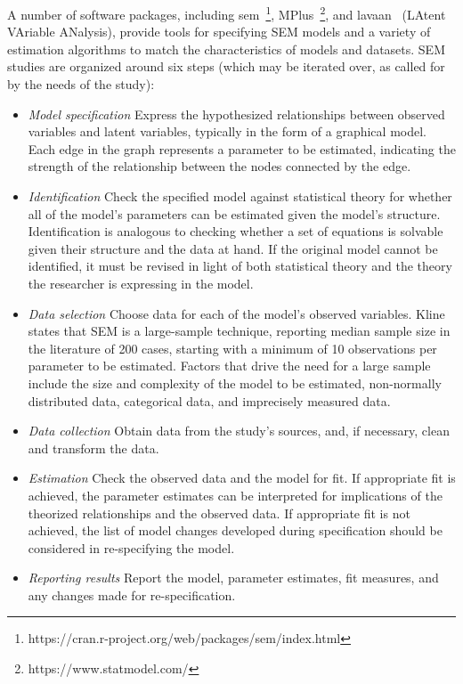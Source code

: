 A number of software packages, including sem~\footnote{https://cran.r-project.org/web/packages/sem/index.html}, MPlus~\footnote{https://www.statmodel.com/}, and lavaan~\cite{roseel2012lavaan} (LAtent VAriable ANalysis), provide tools for specifying SEM models and a variety of estimation algorithms to match the characteristics of models and datasets. 
SEM studies are organized around six steps (which may be iterated over, as called for by the needs of the study): 
\begin{itemize}
\item \textit{Model specification} Express the hypothesized relationships between observed variables and latent variables, typically in the form of a graphical model. Each edge in the graph represents a parameter to be estimated, indicating the strength of the relationship between the nodes connected by the edge.

\item \textit{Identification} 
Check the specified model against statistical theory for whether all of the model’s parameters can be estimated given the model's structure. Identification is analogous to checking whether a set of equations is solvable given their structure and the data at hand. If the original model cannot be identified, it must be revised in light of both statistical theory and the theory the researcher is expressing in the model.

\item \textit{Data selection}
Choose data for each of the model’s observed variables. Kline ~\cite{kline2015principles} states that SEM is a large-sample technique, reporting median sample size in the literature of 200 cases, starting with a minimum of 10 observations per parameter to be estimated.  Factors that drive the need for a large sample include the size and complexity of the model to be estimated, non-normally distributed data, categorical data, and imprecisely measured data.

\item \textit{Data collection}
Obtain data from the study's sources, and, if necessary, clean and transform the data.

\item \textit{Estimation}
Check the observed data and the model for fit.  If appropriate fit is achieved, the parameter estimates can be interpreted for implications of the theorized relationships and the observed data. If appropriate fit is not achieved, the list of model changes developed during specification should be considered in re-specifying the model.

\item \textit{Reporting results}
Report the model, parameter estimates,  fit measures, and any changes made for re-specification.
\end{itemize}

